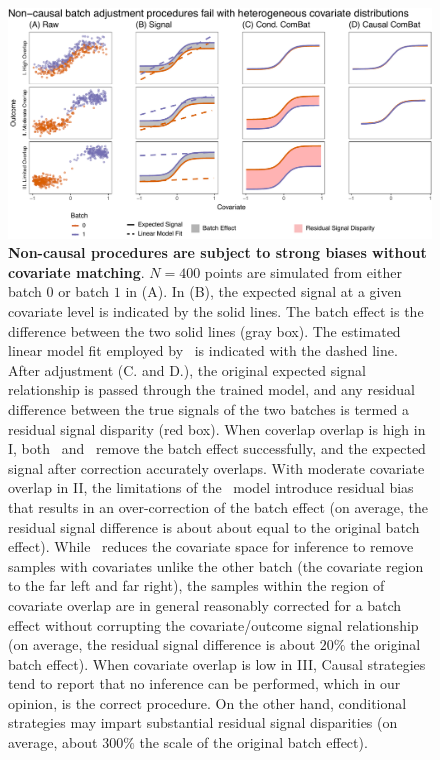 \begin{figure}[h]
    \centering
    \includegraphics[width=\linewidth]{Figures/Content/sim_nlin_adjust.pdf}
    \caption{\textbf{Non-causal procedures are subject to strong biases without covariate matching}. $N=400$ points are simulated from either batch $0$ or batch $1$ in (A). In (B), the expected signal at a given covariate level is indicated by the solid lines. The batch effect is the difference between the two solid lines (gray box). The estimated linear model fit employed by \ccombat~is indicated with the dashed line. After adjustment (C. and D.), the original expected signal relationship is passed through the trained model, and any residual difference between the true signals of the two batches is termed a residual signal disparity (red box). When coverlap overlap is high in I, both \ccombat~and \cccombat~remove the batch effect successfully, and the expected signal after correction accurately overlaps. With moderate covariate overlap in II, the limitations of the \ccombat~model introduce residual bias that results in an over-correction of the batch effect (on average, the residual signal difference is about about equal to the original batch effect). While \cccombat~reduces the covariate space for inference to remove samples with covariates unlike the other batch (the covariate region to the far left and far right), the samples within the region of covariate overlap are in general reasonably corrected for a batch effect without corrupting the covariate/outcome signal relationship (on average, the residual signal difference is about $20\%$ the original batch effect). When covariate overlap is low in III, Causal strategies tend to report that no inference can be performed, which in our opinion, is the correct procedure. On the other hand, conditional strategies may impart substantial residual signal disparities (on average, about $300\%$ the scale of the original batch effect).}
    \label{fig:sim_nlin_adjust}
\end{figure}

